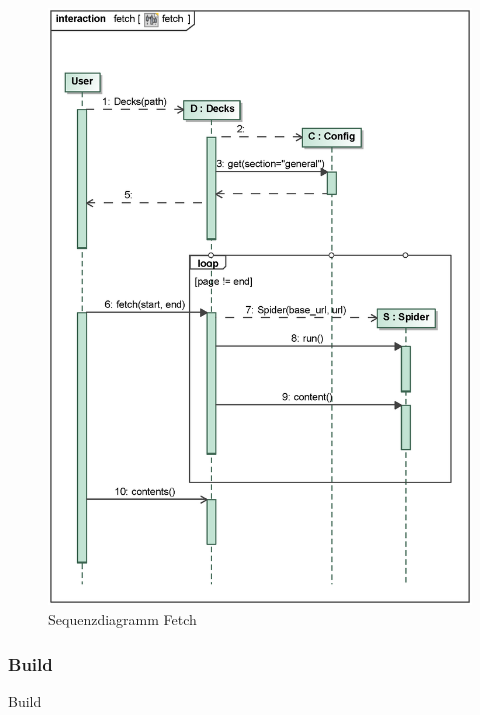 \begin{figure}[H]
    \myfloatalign
    \includegraphics[width=\textwidth]{gfx/MtGDeepAnalysis/fetch.eps}
    \caption{Sequenzdiagramm Fetch} %
    \label{fig:seq:fetch}
\end{figure}

\subsubsection{Build} %
Build \cite{mtgtop8} %

